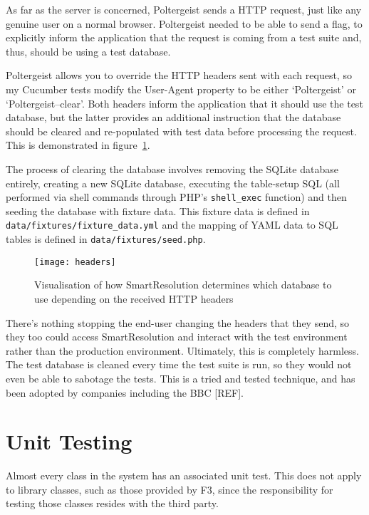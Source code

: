 As far as the server is concerned, Poltergeist sends a HTTP request, just like any genuine user on a normal browser. Poltergeist needed to be able to send a flag, to explicitly inform the application that the request is coming from a test suite and, thus, should be using a test database.

Poltergeist allows you to override the HTTP headers sent with each request, so my Cucumber tests modify the User-Agent property to be either `Poltergeist' or `Poltergeist--clear'. Both headers inform the application that it should use the test database, but the latter provides an additional instruction that the database should be cleared and re-populated with test data before processing the request. This is demonstrated in figure~\ref{uml:headers}.

The process of clearing the database involves removing the SQLite database entirely, creating a new SQLite database, executing the table-setup SQL (all performed via shell commands through PHP's \lstinline{shell_exec} function) and then seeding the database with fixture data. This fixture data is defined in \lstinline{data/fixtures/fixture_data.yml} and the mapping of YAML data to SQL tables is defined in \lstinline{data/fixtures/seed.php}.

\begin{figure}[h!]
  \centering
    \ifimages
    \texttt{[image: headers]}
    \fi
  \caption{Visualisation of how SmartResolution determines which database to use depending on the received HTTP headers}
  \label{uml:headers}
\end{figure}

There's nothing stopping the end-user changing the headers that they send, so they too could access SmartResolution and interact with the test environment rather than the production environment. Ultimately, this is completely harmless. The test database is cleaned every time the test suite is run, so they would not even be able to sabotage the tests. This is a tried and tested technique, and has been adopted by companies including the BBC [REF].

\section{Unit Testing}

Almost every class in the system has an associated unit test. This does not apply to library classes, such as those provided by F3, since the responsibility for testing those classes resides with the third party.

